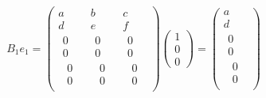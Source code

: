 \documentclass[oneside,english]{amsbook}
\numberwithin{section}{chapter}
\theoremstyle{plain}
\theoremstyle{definition}
\begin{document}
\[B_{1}e_{1} = \begin{pmatrix}
	a & b & c \\
	d & e & f \\
	\begin{matrix}
		0 \\
		0 \\
		\begin{matrix}
			0 \\
			0
		\end{matrix}
	\end{matrix} & \begin{matrix}
		0 \\
		0 \\
		\begin{matrix}
			0 \\
			0
		\end{matrix}
	\end{matrix} & \begin{matrix}
		0 \\
		0 \\
		\begin{matrix}
			0 \\
			0
		\end{matrix}
	\end{matrix}
\end{pmatrix}\begin{pmatrix}
	1 \\
	0 \\
	0
\end{pmatrix} = \begin{pmatrix}
	a \\
	d \\
	\begin{matrix}
		0 \\
		0 \\
		\begin{matrix}
			0 \\
			0
		\end{matrix}
	\end{matrix}
\end{pmatrix}\]
\end{document}
